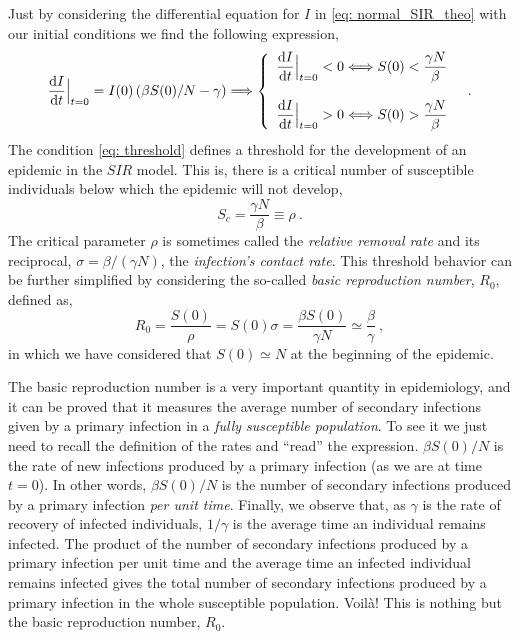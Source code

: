 Just by considering the differential equation for $I$ in \cref{eq:
  normal_SIR_theo} with our initial conditions we find the following
expression,
\begin{equation}\label{eq: threshold}
  \frac{\mathrm{d} I}{\mathrm{d} t}\Big|_{t=0}^{}=I(0)\left(\beta
    S(0)/N-\gamma\right)\Longrightarrow\left\{\begin{array}{l}
    \displaystyle\frac{\mathrm{d} I}{\mathrm{d} t}\Big|_{t=0}^{}<0 \Longleftrightarrow
    S(0)<\frac{\gamma N}{\beta} \\\\
    \displaystyle\frac{\mathrm{d} I}{\mathrm{d} t}\Big|_{t=0}^{}>0 \Longleftrightarrow
    S(0)>\frac{\gamma N}{\beta}
  \end{array}\right. \ \ .
\end{equation}
The condition \cref{eq: threshold} defines a threshold for the development of
an epidemic in the $SIR$ model. This is, there is a critical number of
susceptible
individuals below which the epidemic will not develop,
\begin{equation}
  S_c=\frac{\gamma N}{\beta}\equiv \rho \ .
\end{equation}
The critical parameter $\rho$ is sometimes called the \textit{relative removal
  rate} and its reciprocal, $\sigma=\beta/(\gamma N)$, the \textit{infection’s
  contact rate}. This threshold behavior can be further simplified by
considering the so-called \textit{basic reproduction number}, $R_0$, defined
as,
\begin{equation}
  R_0=\frac{S(0)}{\rho}=S(0)\sigma=\frac{\beta S(0)}{\gamma
    N}\simeq\frac{\beta}{\gamma} \ ,
\end{equation}
in which we have considered that $S(0)\simeq N$ at the beginning of the
epidemic.

The basic reproduction number is a very important quantity in
epidemiology, and it can be proved that it measures the average number of
secondary infections given by a primary infection in a \textit{fully
  susceptible population}. To see it we just need to recall the definition of
the rates and ``read'' the expression. $\beta S(0)/N$ is the rate of new
infections produced by a primary infection (as we are at time $t=0$). In other
words, $\beta	S(0)/N$ is the number of secondary infections produced by a
primary infection \textit{per unit time}. Finally, we observe that, as $\gamma$
is the rate of recovery of infected individuals, $1/\gamma$ is the average time
an individual remains infected. The product of the number of secondary
infections produced by a primary infection per unit time and the average time
an infected individual remains infected gives the total number of secondary
infections produced by a primary infection in the whole susceptible population.
Voilà! This is nothing but the basic reproduction number, $R_0$.

